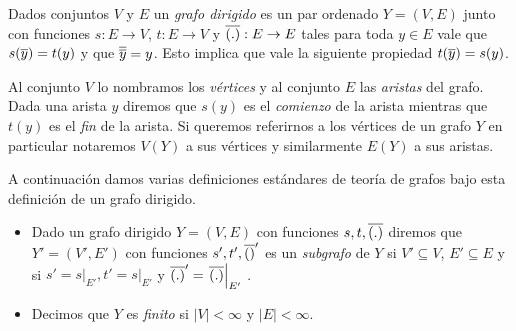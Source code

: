 \documentclass[tesis.tex]{subfiles}
\begin{document}
\begin{deff}
	Dados conjuntos $V$ y $E$ un \emph{grafo dirigido} es un par ordenado $Y= (V,E)$ junto con funciones
	$s:E \to V$, $t:E \to V$ y $\overline{(.)}:E \to E$ tales para toda $y \in E$ vale que $s(\overline{y}) = t(y)$ y que $\overline{\overline y} = y$.
	Esto implica que vale la siguiente propiedad $t(\overline y) = s(y)$.
	
	Al conjunto $V$ lo nombramos los \emph{vértices} y al conjunto $E$ las \emph{aristas} del grafo.
	Dada una arista $y$ diremos que $s(y)$ es el \emph{comienzo} de la arista mientras que $t(y)$ es el \emph{fin} de la arista.
	Si queremos referirnos a los vértices de un grafo $Y$ en particular notaremos $V(Y)$ a sus vértices y similarmente $E(Y)$ a sus aristas.
	
	
	 
	
%	
%	

	
	
	
	A continuación damos varias definiciones estándares de teoría de grafos bajo esta definición de un grafo dirigido.
	\begin{itemize}

		\item Dado un grafo dirigido $Y=(V,E)$ con funciones $s,t, \overline{(.)}$ diremos que $Y'=(V',E')$ con funciones $s',t',\overline{()}'$ es un \emph{subgrafo} de $Y$ si $V' \subseteq V$, $E' \subseteq E$ y si $s'=\left. s \right|_{E'}, t' = \left. s \right|_{E'}$ y $\overline{(.)}' = \left. \overline{(.)} \right|_{E'}$ .
		
		\item Decimos que $Y$ es \emph{finito} si $|V| < \infty$ y $|E| < \infty$.	
		

\end{itemize}
\end{deff}
\end{document}
